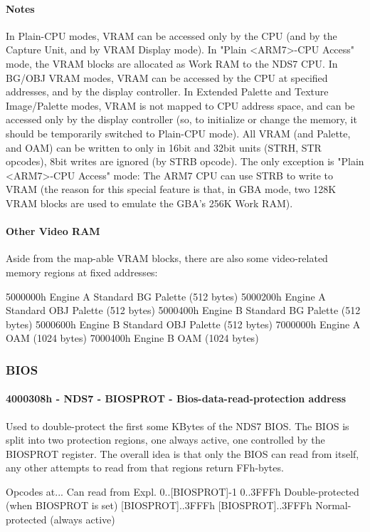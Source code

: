 \documentclass[11pt,a4paper]{proc}
\begin{document}
\begin{flushleft}
\paragraph{Notes}
In Plain-CPU modes, VRAM can be accessed only by the CPU (and by the Capture Unit, and by VRAM Display mode). In "Plain <ARM7>-CPU Access" mode, the VRAM blocks are allocated as Work RAM to the NDS7 CPU.
In BG/OBJ VRAM modes, VRAM can be accessed by the CPU at specified addresses, and by the display controller.
In Extended Palette and Texture Image/Palette modes, VRAM is not mapped to CPU address space, and can be accessed only by the display controller (so, to initialize or change the memory, it should be temporarily switched to Plain-CPU mode).
All VRAM (and Palette, and OAM) can be written to only in 16bit and 32bit units (STRH, STR opcodes), 8bit writes are ignored (by STRB opcode). The only exception is "Plain <ARM7>-CPU Access" mode: The ARM7 CPU can use STRB to write to VRAM (the reason for this special feature is that, in GBA mode, two 128K VRAM blocks are used to emulate the GBA's 256K Work RAM).

\paragraph{Other Video RAM}
Aside from the map-able VRAM blocks, there are also some video-related memory regions at fixed addresses:

  5000000h Engine A Standard BG Palette (512 bytes)
  5000200h Engine A Standard OBJ Palette (512 bytes)
  5000400h Engine B Standard BG Palette (512 bytes)
  5000600h Engine B Standard OBJ Palette (512 bytes)
  7000000h Engine A OAM (1024 bytes)
  7000400h Engine B OAM (1024 bytes)

\subsubsection{BIOS}
\paragraph{4000308h - NDS7 - BIOSPROT - Bios-data-read-protection address}
Used to double-protect the first some KBytes of the NDS7 BIOS. The BIOS is split into two protection regions, one always active, one controlled by the BIOSPROT register. The overall idea is that only the BIOS can read from itself, any other attempts to read from that regions return FFh-bytes.

  Opcodes at...      Can read from      Expl.
  0..[BIOSPROT]-1    0..3FFFh           Double-protected (when BIOSPROT is set)
  [BIOSPROT]..3FFFh  [BIOSPROT]..3FFFh  Normal-protected (always active)


\end{flushleft}
\end{document}
